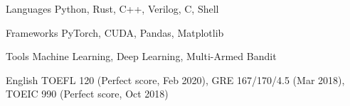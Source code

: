 

\begin{cvskills}

  \cvskill
    {Languages} %
    {Python, Rust, C++, Verilog, C, Shell} %

  \cvskill
    {Frameworks} %
    {PyTorch, CUDA, Pandas, Matplotlib} %

  \cvskill
    {Tools} %
    {Machine Learning, Deep Learning, Multi-Armed Bandit} %

  \cvskill
    {English} %
    {TOEFL 120 (Perfect score, Feb 2020), GRE 167/170/4.5 (Mar 2018), TOEIC 990 (Perfect score, Oct 2018)} %

\end{cvskills}
